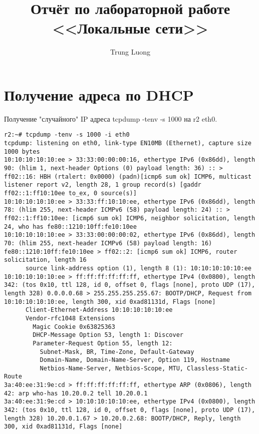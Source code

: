 \documentclass[a4paper,12pt]{article}
\title{Отчёт по лабораторной работе \\ <<Локальные сети>>}
\author{Trung Luong}
\begin{document}
\maketitle

\tableofcontents


\section{Получение адреса по DHCP}

Получение "случайного" IP адреса
tcpdump -tenv -s 1000 на r2 eth0.

\begin{Verbatim}
r2:~# tcpdump -tenv -s 1000 -i eth0
tcpdump: listening on eth0, link-type EN10MB (Ethernet), capture size 1000 bytes
10:10:10:10:10:ee > 33:33:00:00:00:16, ethertype IPv6 (0x86dd), length 90: (hlim 1, next-header Options (0) payload length: 36) :: > ff02::16: HBH (rtalert: 0x0000) (padn)[icmp6 sum ok] ICMP6, multicast listener report v2, length 28, 1 group record(s) [gaddr ff02::1:ff10:10ee to_ex, 0 source(s)]
10:10:10:10:10:ee > 33:33:ff:10:10:ee, ethertype IPv6 (0x86dd), length 78: (hlim 255, next-header ICMPv6 (58) payload length: 24) :: > ff02::1:ff10:10ee: [icmp6 sum ok] ICMP6, neighbor solicitation, length 24, who has fe80::1210:10ff:fe10:10ee
10:10:10:10:10:ee > 33:33:00:00:00:02, ethertype IPv6 (0x86dd), length 70: (hlim 255, next-header ICMPv6 (58) payload length: 16) fe80::1210:10ff:fe10:10ee > ff02::2: [icmp6 sum ok] ICMP6, router solicitation, length 16
	  source link-address option (1), length 8 (1): 10:10:10:10:10:ee
10:10:10:10:10:ee > ff:ff:ff:ff:ff:ff, ethertype IPv4 (0x0800), length 342: (tos 0x10, ttl 128, id 0, offset 0, flags [none], proto UDP (17), length 328) 0.0.0.0.68 > 255.255.255.255.67: BOOTP/DHCP, Request from 10:10:10:10:10:ee, length 300, xid 0xad81131d, Flags [none]
	  Client-Ethernet-Address 10:10:10:10:10:ee
	  Vendor-rfc1048 Extensions
	    Magic Cookie 0x63825363
	    DHCP-Message Option 53, length 1: Discover
	    Parameter-Request Option 55, length 12: 
	      Subnet-Mask, BR, Time-Zone, Default-Gateway
	      Domain-Name, Domain-Name-Server, Option 119, Hostname
	      Netbios-Name-Server, Netbios-Scope, MTU, Classless-Static-Route
3a:40:ee:31:9e:cd > ff:ff:ff:ff:ff:ff, ethertype ARP (0x0806), length 42: arp who-has 10.20.0.2 tell 10.20.0.1
3a:40:ee:31:9e:cd > 10:10:10:10:10:ee, ethertype IPv4 (0x0800), length 342: (tos 0x10, ttl 128, id 0, offset 0, flags [none], proto UDP (17), length 328) 10.20.0.1.67 > 10.20.0.2.68: BOOTP/DHCP, Reply, length 300, xid 0xad81131d, Flags [none]

\end{Verbatim}
\end{document}
